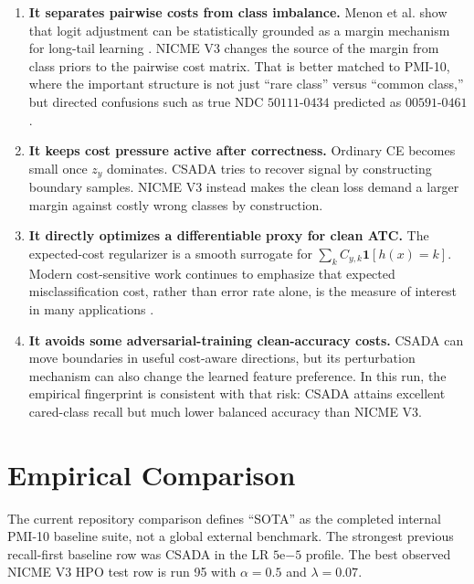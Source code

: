 \documentclass[11pt]{article}
\newcommand{\I}{\mathbf{1}}
\theoremstyle{definition}
\theoremstyle{plain}
\theoremstyle{remark}
\begin{document}
\begin{enumerate}
  \item \textbf{It separates pairwise costs from class imbalance.}
  Menon et al. show that logit adjustment can be statistically grounded as a margin mechanism for long-tail learning \cite{menon2021logit}.
  NICME V3 changes the source of the margin from class priors to the pairwise cost matrix.
  That is better matched to PMI-10, where the important structure is not just ``rare class'' versus ``common class,'' but directed confusions such as true NDC $50111$-$0434$ predicted as $00591$-$0461$.
  \item \textbf{It keeps cost pressure active after correctness.}
  Ordinary CE becomes small once $z_y$ dominates.
  CSADA tries to recover signal by constructing boundary samples.
  NICME V3 instead makes the clean loss demand a larger margin against costly wrong classes by construction.
  \item \textbf{It directly optimizes a differentiable proxy for clean ATC.}
  The expected-cost regularizer is a smooth surrogate for $\sum_k C_{y,k}\I[h(x)=k]$.
  Modern cost-sensitive work continues to emphasize that expected misclassification cost, rather than error rate alone, is the measure of interest in many applications \cite{komisarenko2025cost}.
  \item \textbf{It avoids some adversarial-training clean-accuracy costs.}
  CSADA can move boundaries in useful cost-aware directions, but its perturbation mechanism can also change the learned feature preference.
  In this run, the empirical fingerprint is consistent with that risk: CSADA attains excellent cared-class recall but much lower balanced accuracy than NICME V3.
\end{enumerate}

\section{Empirical Comparison}

The current repository comparison defines ``SOTA'' as the completed internal PMI-10 baseline suite, not a global external benchmark.
The strongest previous recall-first baseline row was CSADA in the LR $5\mathrm{e}{-5}$ profile.
The best observed NICME V3 HPO test row is run 95 with $\alpha=0.5$ and $\lambda=0.07$.
\end{document}

